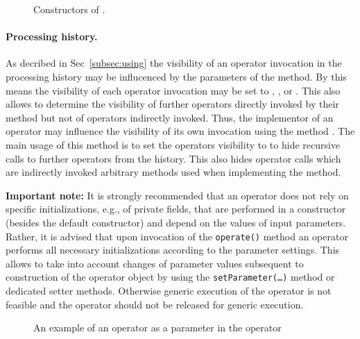 \begin{figure}

\caption{\label{exa:constructor}Constructors of .}
\end{figure}

\paragraph{Processing history.}
As decribed in Sec~\ref{subsec:using} the visibility of an operator invocation in the
processing history may be
influcenced by the parameters of the   method.
By this means the visibility of each operator invocation may be set to
, , or .
This also allows to determine the visibility of further operators directly
invoked by their  method but not of operators indirectly invoked.
Thus, the implementor of an operator may influence the visibility
of its own invocation using the method .
The main usage of this method is to set the operators visibility to 
to hide recursive calls to further operators from the history.
This also hides operator calls which are indirectly invoked arbitrary methods used when implementing
the  method.

\textbf{Important note:} It is strongly recommended that an operator
does not rely on specific initializations, e.g., of private fields, that are
performed in a constructor (besides the default constructor)
and depend on the values of input parameters. Rather,
it is advised that upon invocation of the \texttt{operate()} method an operator performs all necessary initializations according to the parameter settings.
This allows to take into account changes of parameter values subsequent to
construction of the operator object by using the \texttt{setParameter(\ldots)}
method or dedicated setter methods.
Otherwise generic execution of the operator is not feasible and
the operator should not be released for generic execution.

\begin{figure}[tb]

\caption{\label{exa:operatorAsParameter}An example of an operator as a parameter in the operator }
\end{figure}

